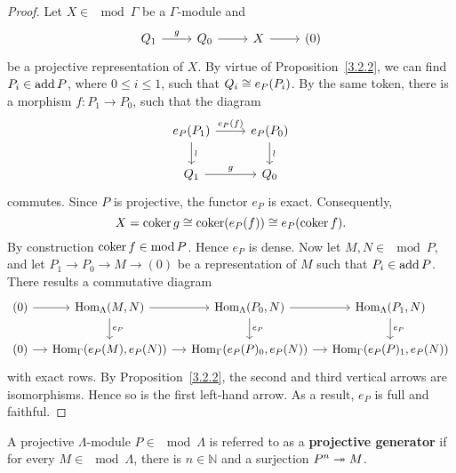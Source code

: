 
\begin{proof}
  Let $X \in \mod{\Gamma}$ be a $\Gamma$-module and
   \[\begin{tikzcd}
    Q_1 \rar["g"] & Q_0 \rar& X \rar& (0)
   \end{tikzcd}\]
be a projective representation of $X$. By virtue of Proposition~\ref{3.2.2}, we can find $P_i \in \operatorname{add}{P}$, where $0 \leq i \leq 1$, such that
  $Q_i \cong e_P(P_i)$. By the same token, there is a morphism $f: P_1 \to P_0$, such
  that the diagram
  \[\begin{tikzcd}
      e_P(P_1) \rar["e_P(f)"] \dar["\wr"] & e_P(P_0) \dar["\wr"]\\
      Q_1 \rar["g"]& Q_0
    \end{tikzcd}\]
commutes. Since $P$ is projective, the functor $e_P$ is exact.
  Consequently,
    \[ X = \operatorname{coker} g \cong \operatorname{coker} (e_P(f)) \cong e_P(\operatorname{coker} f).\]
  By construction $\operatorname{coker} f \in \operatorname{mod}{P}$. Hence $e_P$ is dense.
  Now let $M,N \in \mod{P}$, and let $P_1 \to P_0 \to M \to (0)$ be a representation of $M$
  such that $P_i \in \operatorname{add}{P}$. There results a commutative diagram
  \[\begin{tikzcd}[column sep=small]
      (0) \rar& \Hom_\Lambda(M,N) \dar["e_P"]\rar& \Hom_\Lambda(P_0,N) \dar["e_P"]\rar& \Hom_\Lambda(P_1,N) \dar["e_P"]\\
      (0) \rar& \Hom_\Gamma(e_P(M),e_P(N)) \rar& \Hom_\Gamma(e_P(P)_0,e_P(N)) \rar& \Hom_\Gamma(e_P(P)_1,e_P(N))
    \end{tikzcd}\]
  with exact rows.
By Proposition~\ref{3.2.2}, the second and third vertical arrows are isomorphisms. Hence so
is the first left-hand arrow.
As a result, $e_P$ is full and faithful.
\end{proof}


\begin{definition}
  A projective $\Lambda$-module $P \in \mod{\Lambda}$ is referred to as a \textbf{projective generator} if for every $M \in \mod{\Lambda}$, there is $n \in \mathbb{N}$ and a surjection $P^n \twoheadrightarrow M$.
\end{definition}


